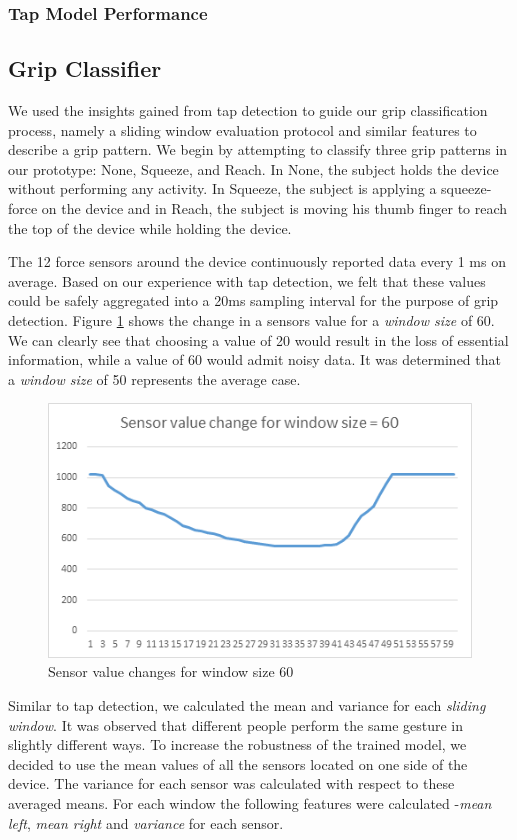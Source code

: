 \subsubsection{Tap Model Performance}


\subsection{Grip Classifier}
We used the insights gained from tap detection to guide our grip classification process, namely a sliding window evaluation protocol and similar features to describe a grip pattern. We begin by attempting to classify three grip patterns in our prototype: None, Squeeze, and Reach. In None, the subject holds the device without performing any activity. In Squeeze, the subject is applying a squeeze-force on the device and in Reach, the subject is moving his thumb finger to reach the top of the device while holding the device.  
\par
The 12 force sensors around the device continuously reported data every 1 ms on average. Based on our experience with tap detection, we felt that these values could be safely aggregated into a 20ms sampling interval for the purpose of grip detection. Figure \ref{fig:window_60} shows the change in a sensors value for a \textit{window size} of 60. We can clearly see that choosing a value of 20 would result in the loss of essential information, while a value of 60 would admit noisy data. It was determined that a \textit{window size} of 50 represents the average case.

\begin{figure}[h]
\includegraphics[width=.45\textwidth]{window_60.png}
\caption{Sensor value changes for window size 60}
\label{fig:window_60}
\end{figure}

\par
Similar to tap detection, we calculated the mean and variance for each \textit{sliding window}. It was observed that different people perform the same gesture in slightly different ways. To increase the robustness of the trained model, we decided to use the mean values of all the sensors located on one side of the device. The variance for each sensor was calculated with respect to these averaged means. For each window the following features were calculated -\textit{mean left}, \textit{mean right} and \textit{variance} for each sensor.

